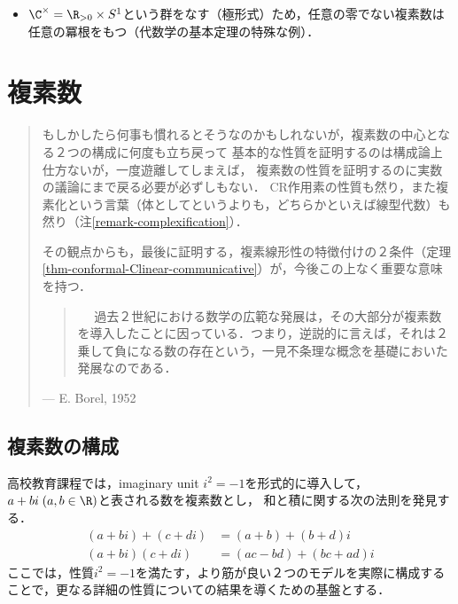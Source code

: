 \documentclass[uplatex, dvipdfmx]{jsreport}
\begin{document}
\begin{itemize}
    \item $\C^\times=\R_{>0}\times S^1$という群をなす（極形式）ため，任意の零でない複素数は任意の冪根をもつ（代数学の基本定理の特殊な例）．
\end{itemize}

\chapter{複素数}

\begin{quotation}
    もしかしたら何事も慣れるとそうなのかもしれないが，複素数の中心となる２つの構成に何度も立ち戻って
    基本的な性質を証明するのは構成論上仕方ないが，一度遊離してしまえば，
    複素数の性質を証明するのに実数の議論にまで戻る必要が必ずしもない．
    CR作用素の性質も然り，また複素化という言葉（体としてというよりも，どちらかといえば線型代数）も然り（注\ref{remark-complexification}）．

    その観点からも，最後に証明する，複素線形性の特徴付けの２条件（定理\ref{thm-conformal-Clinear-communicative}）が，今後この上なく重要な意味を持つ．
    \begin{quote}
　      過去２世紀における数学の広範な発展は，その大部分が複素数を導入したことに因っている．つまり，逆説的に言えば，それは２乗して負になる数の存在という，一見不条理な概念を基礎においた発展なのである．\cite{Elias Stein}
    \end{quote}
    \begin{flushright}
        --- E. Borel, 1952
    \end{flushright}
\end{quotation}

\section{複素数の構成}

\begin{screen}
    高校教育課程では，imaginary unit $i^2=-1$を形式的に導入して，$a+bi\;(a,b\in\R)$と表される数を複素数とし，
    和と積に関する次の法則を発見する．
    \begin{align}
        (a+bi) + (c+di) &= (a+b) + (b+d)i\\
        (a+bi)(c+di) &= (ac-bd) + (bc+ad)i
    \end{align}
    ここでは，性質$i^2=-1$を満たす，より筋が良い２つのモデルを実際に構成することで，更なる詳細の性質についての結果を導くための基盤とする．
\end{screen}
\end{document}
